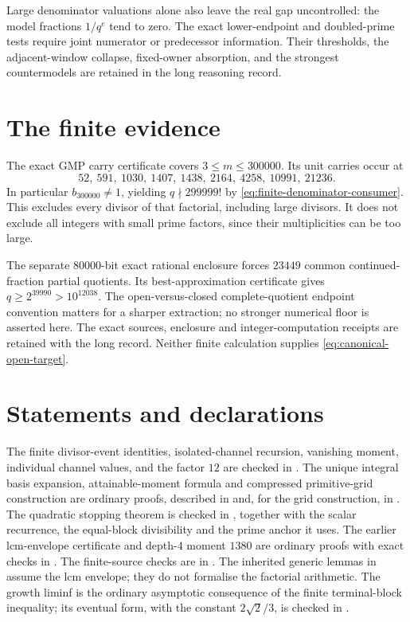\documentclass[11pt]{article}
\begin{document}
Large denominator valuations alone also leave the real gap uncontrolled:
the model fractions $1/q^e$ tend to zero.  The exact lower-endpoint and
doubled-prime tests require joint numerator or predecessor information.
Their thresholds, the adjacent-window collapse, fixed-owner absorption,
and the strongest countermodels are retained in the long reasoning record.

\section{The finite evidence}\label{sec:finite}

The exact GMP carry certificate covers $3\le m\le300000$.  Its unit carries
occur at
\[
52,\ 591,\ 1030,\ 1407,\ 1438,\ 2164,\ 4258,\ 10991,\ 21236.
\]
In particular $b_{300000}\ne1$, yielding $q\nmid299999!$ by
\eqref{eq:finite-denominator-consumer}.  This excludes every divisor of that
factorial, including large divisors.  It does not exclude all integers with
small prime factors, since their multiplicities can be too large.

The separate $80000$-bit exact rational enclosure forces $23449$ common
continued-fraction partial quotients.  Its best-approximation certificate gives
$q\ge2^{39990}>10^{12038}$.  The open-versus-closed complete-quotient endpoint
convention matters for a sharper extraction; no stronger numerical floor is
asserted here.  The exact sources, enclosure and integer-computation receipts
are retained with the long record.  Neither finite calculation supplies
\eqref{eq:canonical-open-target}.

\section*{Statements and declarations}\label{app:sources}

\begingroup\small\raggedright
The finite divisor-event identities, isolated-channel recursion, vanishing
moment, individual channel values, and the factor $12$ are checked in
.  The unique integral basis expansion,
attainable-moment formula and compressed primitive-grid construction are
ordinary proofs, described in  and, for the
grid construction, in
.  The quadratic stopping theorem
is checked in , together with the
scalar recurrence, the equal-block divisibility and the prime anchor it uses.
The earlier lcm-envelope certificate and depth-$4$ moment $1380$ are
ordinary proofs with exact checks in .
The finite-source checks are in .
The inherited generic lemmas in  assume
the lcm envelope; they do not formalise the factorial arithmetic.
The growth liminf is the
ordinary asymptotic consequence of the finite terminal-block inequality; its
eventual form, with the constant $2\sqrt2/3$, is checked in
.
\end{document}
